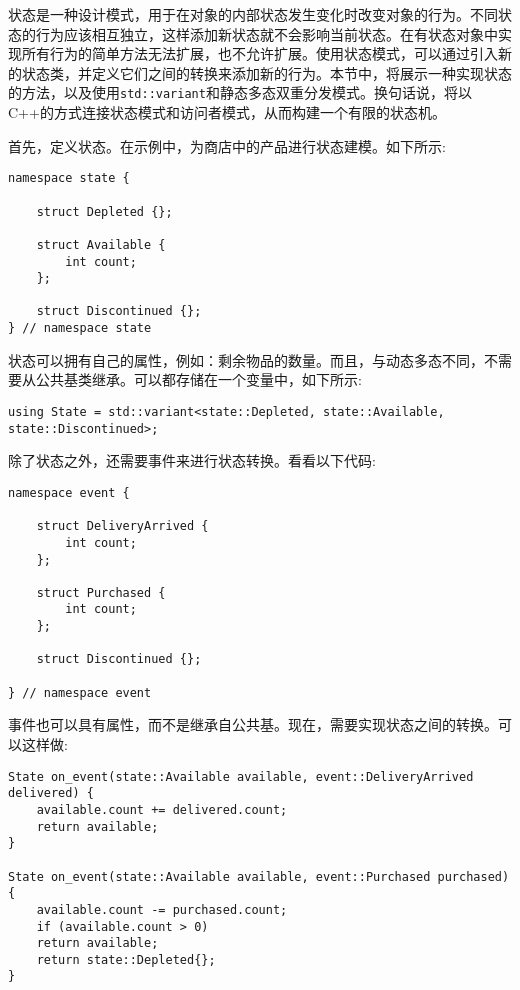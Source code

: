 状态是一种设计模式，用于在对象的内部状态发生变化时改变对象的行为。不同状态的行为应该相互独立，这样添加新状态就不会影响当前状态。在有状态对象中实现所有行为的简单方法无法扩展，也不允许扩展。使用状态模式，可以通过引入新的状态类，并定义它们之间的转换来添加新的行为。本节中，将展示一种实现状态的方法，以及使用\texttt{std::variant}和静态多态双重分发模式。换句话说，将以C++的方式连接状态模式和访问者模式，从而构建一个有限的状态机。

首先，定义状态。在示例中，为商店中的产品进行状态建模。如下所示:

\begin{lstlisting}[style=styleCXX]
namespace state {
	
	struct Depleted {};
	
	struct Available {
		int count;
	};

	struct Discontinued {};
} // namespace state
\end{lstlisting}

状态可以拥有自己的属性，例如：剩余物品的数量。而且，与动态多态不同，不需要从公共基类继承。可以都存储在一个变量中，如下所示:

\begin{lstlisting}[style=styleCXX]
using State = std::variant<state::Depleted, state::Available,
state::Discontinued>;
\end{lstlisting}

除了状态之外，还需要事件来进行状态转换。看看以下代码:

\begin{lstlisting}[style=styleCXX]
namespace event {
	
	struct DeliveryArrived {
		int count;
	};

	struct Purchased {
		int count;
	};

	struct Discontinued {};
	
} // namespace event
\end{lstlisting}

事件也可以具有属性，而不是继承自公共基。现在，需要实现状态之间的转换。可以这样做:

\begin{lstlisting}[style=styleCXX]
State on_event(state::Available available, event::DeliveryArrived
delivered) {
	available.count += delivered.count;
	return available;
}

State on_event(state::Available available, event::Purchased purchased) {
	available.count -= purchased.count;
	if (available.count > 0)
	return available;
	return state::Depleted{};
}
\end{lstlisting}

